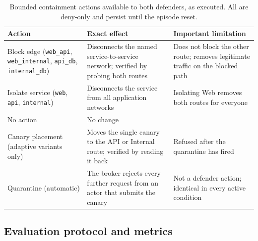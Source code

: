 \documentclass[10pt,a4paper]{article}
\begin{document}
\begin{table}[t]
\centering\footnotesize
\caption{Bounded containment actions available to both defenders, as executed. All are deny-only and persist until the episode reset.}
\label{tab:actions}
\begin{tabularx}{\textwidth}{P{3.0cm} L L}
\toprule
\textbf{Action} & \textbf{Exact effect} & \textbf{Important limitation} \\
\midrule
Block edge (\texttt{web\_api}, \texttt{web\_internal}, \texttt{api\_db}, \texttt{internal\_db}) & Disconnects the named service-to-service network; verified by probing both routes & Does not block the other route; removes legitimate traffic on the blocked path \\
Isolate service (\texttt{web}, \texttt{api}, \texttt{internal}) & Disconnects the service from all application networks & Isolating Web removes both routes for everyone \\
No action & No change & \\
Canary placement (adaptive variants only) & Moves the single canary to the API or Internal route; verified by reading it back & Refused after the quarantine has fired \\
Quarantine (automatic) & The broker rejects every further request from an actor that submits the canary & Not a defender action; identical in every active condition \\
\bottomrule
\end{tabularx}
\end{table}

\subsection{Evaluation protocol and metrics}\label{sec:eval}
\end{document}
